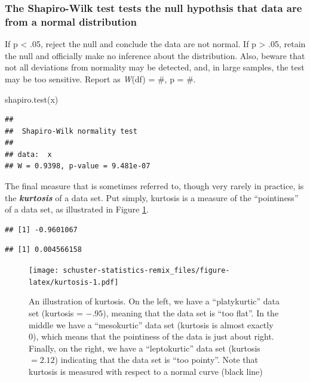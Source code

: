 \documentclass[
]{book}
\newenvironment{Shaded}{\begin{snugshade}}{\end{snugshade}}
\newcommand{\FunctionTok}[1]{\textcolor[rgb]{0.00,0.00,0.00}{#1}}
\newcommand{\NormalTok}[1]{#1}
\begin{document}
\hypertarget{the-shapiro-wilk-test-tests-the-null-hypothsis-that-data-are-from-a-normal-distribution}{%
\subsubsection{The Shapiro-Wilk test tests the null hypothsis that data are from a normal distribution}\label{the-shapiro-wilk-test-tests-the-null-hypothsis-that-data-are-from-a-normal-distribution}}

If p \textless{} .05, reject the null and conclude the data are not normal. If p \textgreater{} .05, retain the null and officially make no inference about the distribution. Also, beware that not all deviations from normality may be detected, and, in large samples, the test may be too sensitive. Report as \emph{W}(df) = \#, p = \#.

\begin{Shaded}
\begin{Highlighting}[]
\FunctionTok{shapiro.test}\NormalTok{(x) }
\end{Highlighting}
\end{Shaded}

\begin{verbatim}
## 
##  Shapiro-Wilk normality test
## 
## data:  x
## W = 0.9398, p-value = 9.481e-07
\end{verbatim}

The final measure that is sometimes referred to, though very rarely in practice, is the \textbf{\emph{kurtosis}} of a data set. Put simply, kurtosis is a measure of the ``pointiness'' of a data set, as illustrated in Figure \ref{fig:kurtosis}.

\begin{verbatim}
## [1] -0.9601067
\end{verbatim}

\begin{verbatim}
## [1] 0.004566158
\end{verbatim}

\begin{figure}
\centering
\texttt{[image: schuster-statistics-remix\_files/figure-latex/kurtosis-1.pdf]}
\caption{\label{fig:kurtosis}An illustration of kurtosis. On the left, we have a ``platykurtic'' data set (kurtosis = \(-.95\)), meaning that the data set is ``too flat''. In the middle we have a ``mesokurtic'' data set (kurtosis is almost exactly 0), which means that the pointiness of the data is just about right. Finally, on the right, we have a ``leptokurtic'' data set (kurtosis \(= 2.12\)) indicating that the data set is ``too pointy''. Note that kurtosis is measured with respect to a normal curve (black line)}
\end{figure}
\end{document}
